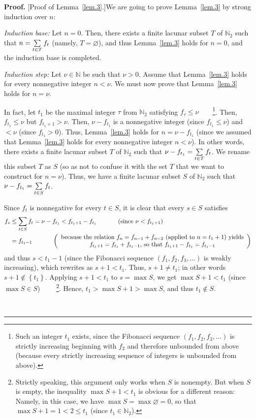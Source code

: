 \documentclass[numbers=enddot,12pt,final,onecolumn,notitlepage]{scrartcl}%
\numberwithin{exer}{section}
\theoremstyle{definition}
\newenvironment{proof}[1][Proof]{\noindent\textbf{#1.} }{\ \rule{0.5em}{0.5em}}
\let\sumnonlimits\sum
\renewcommand{\sum}{\sumnonlimits\limits}
\begin{document}
\begin{proof}
[Proof of Lemma~\ref{lem.3}.]We are going to prove Lemma~\ref{lem.3} by strong
induction over $n$:

\textit{Induction base:} Let $n=0$. Then, there exists a finite lacunar subset
$T$ of $\mathbb{N}_{2}$ such that $n=\sum\limits_{t\in T}f_{t}$ (namely,
$T=\varnothing$), and thus Lemma~\ref{lem.3} holds for $n=0$, and the
induction base is completed.

\textit{Induction step:} Let $\nu\in\mathbb{N}$ be such that $\nu>0$. Assume
that Lemma~\ref{lem.3} holds for every nonnegative integer $n<\nu$. We must
now prove that Lemma~\ref{lem.3} holds for $n=\nu$.

In fact, let $t_{1}$ be the maximal integer $\tau$ from $\mathbb{N}_{2}$
satisfying $f_{\tau}\leq\nu$\ \ \ \ \footnote{Such an integer $t_{1}$ exists,
since the Fibonacci sequence $\left(  f_{1},f_{2},f_{3},\ldots\right)  $ is
strictly increasing beginning with $f_{2}$ and therefore unbounded from above
(because every strictly increasing sequence of integers is unbounded from
above).}. Then, $f_{t_{1}}\leq\nu$ but $f_{t_{1}+1}>\nu$. Then, $\nu-f_{t_{1}%
}$ is a nonnegative integer (since $f_{t_{1}}\leq\nu$) and $<\nu$ (since
$f_{t_{1}}>0$). Thus, Lemma~\ref{lem.3} holds for $n=\nu-f_{t_{1}}$ (since we
assumed that Lemma~\ref{lem.3} holds for every nonnegative integer $n<\nu$).
In other words, there exists a finite lacunar subset $T$ of $\mathbb{N}_{2}$
such that $\nu-f_{t_{1}}=\sum\limits_{t\in T}f_{t}$. We rename this subset $T$
as $S$ (so as not to confuse it with the set $T$ that we want to construct for
$n=\nu$). Thus, we have a finite lacunar subset $S$ of $\mathbb{N}_{2}$ such
that $\nu-f_{t_{1}}=\sum\limits_{t\in S}f_{t}$.

Since $f_{t}$ is nonnegative for every $t\in S$, it is clear that every $s\in
S$ satisfies%
\begin{align*}
f_{s}  &  \leq\sum\limits_{t\in S}f_{t}=\nu-f_{t_{1}}<f_{t_{1}+1}-f_{t_{1}%
}\ \ \ \ \ \ \ \ \ \ \left(  \text{since }\nu<f_{t_{1}+1}\right) \\
&  =f_{t_{1}-1}\ \ \ \ \ \ \ \ \ \ \left(
\begin{array}
[c]{c}%
\text{because the relation }f_{n}=f_{n-1}+f_{n-2}\text{ (applied to }%
n=t_{1}+1\text{) yields}\\
f_{t_{1}+1}=f_{t_{1}}+f_{t_{1}-1}\text{, so that }f_{t_{1}+1}-f_{t_{1}%
}=f_{t_{1}-1}%
\end{array}
\right)
\end{align*}
and thus $s<t_{1}-1$ (since the Fibonacci sequence $\left(  f_{1},f_{2}%
,f_{3},\ldots\right)  $ is weakly increasing), which rewrites as $s+1<t_{1}$.
Thus, $s+1\neq t_{1}$; in other words $s+1\notin\left\{  t_{1}\right\}  $.
Applying $s+1<t_{1}$ to $s=\max S$, we get $\max S+1<t_{1}$ (since $\max S \in
S$) \ \ \ \ \footnote{Strictly speaking, this argument only works when $S$ is
nonempty. But when $S$ is empty, the inequality $\max S + 1 < t_{1}$ is
obvious for a different reason: Namely, in this case, we have $\max S =
\max\varnothing= 0$, so that $\max S + 1 = 1 < 2 \leq t_{1}$ (since $t_{1}
\in\mathbb{N}_{2}$).}. Hence, $t_{1} > \max S + 1 > \max S$, and thus $t_{1}
\notin S$.


\end{proof}
\end{document}
